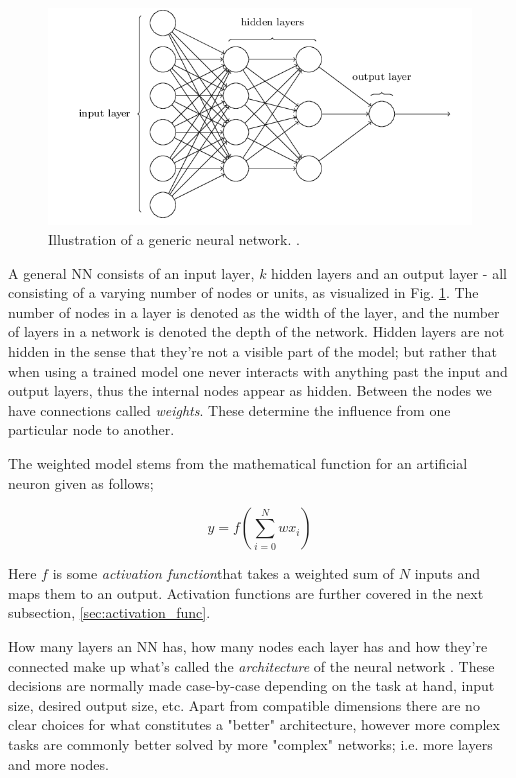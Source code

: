 \begin{figure}[H]
    \centering
    \includegraphics[width=1\linewidth]{project_2/figures/generic_NN.png}
    \caption{Illustration of a generic neural network. \cite[Taken from][Ch.1]{nielsen}.}
    \label{fig:NN}
\end{figure}

A general NN consists of an input layer, $k$ hidden layers and an output layer - all consisting of a varying number of nodes or units, as visualized in Fig. \ref{fig:NN}. The number of nodes in a layer is denoted as the width of the layer, and the number of layers in a network is denoted the depth of the network. 
Hidden layers are not hidden in the sense that they're not a visible part of the model; but rather that when using a trained model one never interacts with anything past the input and output layers, thus the internal nodes appear as hidden. 
Between the nodes we have connections called \textit{weights}. These determine the influence from one particular node to another. 

The weighted model stems from the mathematical function for an artificial neuron given as follows; 

\begin{equation}\label{artifical_neuron}
    y = f\left( \sum_{i=0}^Nwx_i \right) 
\end{equation}

Here $f$ is some \textit{activation function}that takes a weighted sum of $N$ inputs and maps them to an output. Activation functions are further covered in the next subsection, \ref{sec:activation_func}.

How many layers an NN has, how many nodes each layer has and how they're connected make up what's called the \textit{architecture} of the neural network \citep[Ch.1]{nielsen}. These decisions are normally made case-by-case depending on the task at hand, input size, desired output size, etc. Apart from compatible dimensions there are no clear choices for what constitutes a "better" architecture, however more complex tasks are commonly better solved by more "complex" networks; i.e. more layers and more nodes. 


